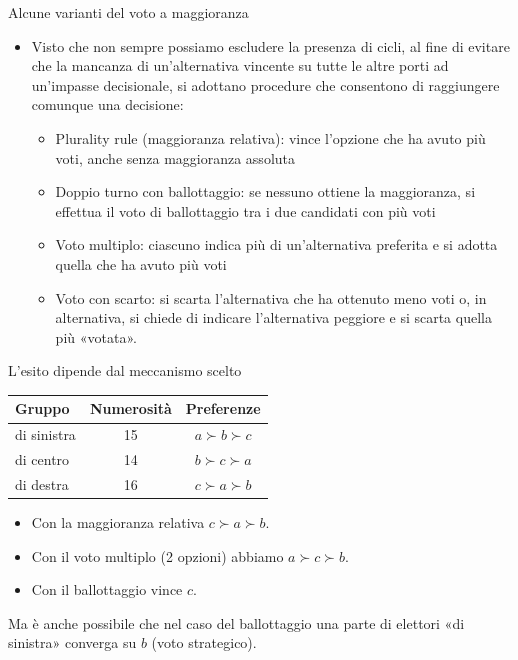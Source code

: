 \documentclass[aspectratio=64,12pt]{beamer}
\begin{document}
\begin{frame}{Alcune varianti del voto a maggioranza}
\begin{itemize}
\item Visto che non sempre possiamo escludere la presenza di cicli, al fine di
evitare che la mancanza di un'alternativa vincente su tutte le altre porti ad
un'impasse decisionale, si adottano procedure che consentono di raggiungere
comunque una decisione:
\begin{itemize}
\item \alert{Plurality rule (maggioranza relativa)}: vince l'opzione che ha avuto più
voti, anche senza maggioranza assoluta
\item \alert{Doppio turno con ballottaggio:} se nessuno ottiene la maggioranza, si
effettua il voto di ballottaggio tra i due candidati con più voti
\item \alert{Voto multiplo:} ciascuno indica più di un'alternativa preferita e si
adotta quella che ha avuto più voti
\item \alert{Voto con scarto:} si scarta l'alternativa che ha ottenuto meno voti o, in
alternativa, si chiede di indicare l'alternativa peggiore e si scarta
quella più «votata».
\end{itemize}
\end{itemize}
\end{frame}

\begin{frame}{L'esito dipende dal meccanismo scelto}
\begin{center}
  \begin{tabular}{lcc}\toprule
  Gruppo & Numerosità &Preferenze\\
  \midrule
  di sinistra & 15 & $a \succ b \succ c$ \\
  di centro & 14 & $b \succ c \succ a$\\
  di destra & 16 & $c \succ a \succ b$\\\bottomrule
  \end{tabular}
\end{center}

\begin{itemize}
\item Con la maggioranza relativa $c\succ a\succ b$.
\item Con il voto multiplo (2 opzioni) abbiamo $a\succ c\succ b$.
\item Con il ballottaggio vince $c$.
\end{itemize}
Ma è anche possibile che nel caso del ballottaggio una parte di elettori «di
sinistra» converga su $b$ (voto strategico).
\end{frame}
\end{document}
